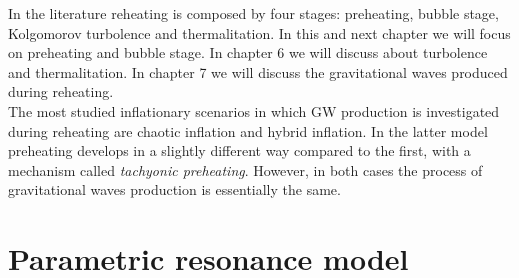 \documentclass[11pt,a4paper,twoside]{book}
\begin{document}
In the literature reheating is composed by four stages: preheating, bubble stage, Kolgomorov turbolence and thermalitation. In this and next chapter we will focus on preheating and bubble stage. In chapter 6 we will discuss about turbolence and thermalitation. In chapter 7 we will discuss the gravitational waves produced during reheating.\\
The most studied inflationary scenarios in which GW production is investigated during reheating are chaotic inflation and hybrid inflation. In the latter model preheating develops in a slightly different way compared to the first, with a mechanism called \textit{tachyonic preheating}. However, in both cases the process of gravitational waves production is essentially the same.

\section{Parametric resonance model}
\end{document}
